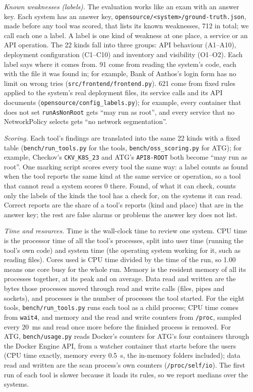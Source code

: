 \documentclass[conference]{IEEEtran}
\begin{document}
\textit{Known weaknesses (labels).} The evaluation works like an exam with an answer key. Each system has an answer key, \texttt{opensource/<system>/ground-truth.json}, made before any tool was scored, that lists its known weaknesses, 712 in total; we call each one a label. A label is one kind of weakness at one place, a service or an API operation. The 22 kinds fall into three groups: API behaviour (A1--A10), deployment configuration (C1--C10) and inventory and visibility (O1--O2). Each label says where it comes from. 91 come from reading the system's code, each with the file it was found in; for example, Bank of Anthos's login form has no limit on wrong tries (\texttt{src/frontend/frontend.py}). 621 come from fixed rules applied to the system's real deployment files, its service calls and its API documents (\texttt{opensource/config\_labels.py}); for example, every container that does not set \texttt{runAsNonRoot} gets ``may run as root'', and every service that no NetworkPolicy selects gets ``no network segmentation''.

\textit{Scoring.} Each tool's findings are translated into the same 22 kinds with a fixed table (\texttt{bench/run\_tools.py} for the tools, \texttt{bench/oss\_scoring.py} for ATG); for example, Checkov's \texttt{CKV\_K8S\_23} and ATG's \texttt{API8-ROOT} both become ``may run as root''. One marking script scores every tool the same way: a label counts as found when the tool reports the same kind at the same service or operation, so a tool that cannot read a system scores 0 there. Found, of what it can check, counts only the labels of the kinds the tool has a check for, on the systems it can read. Correct reports are the share of a tool's reports (kind and place) that are in the answer key; the rest are false alarms or problems the answer key does not list.

\textit{Time and resources.} Time is the wall-clock time to review one system. CPU time is the processor time of all the tool's processes, split into user time (running the tool's own code) and system time (the operating system working for it, such as reading files). Cores used is CPU time divided by the time of the run, so 1.00 means one core busy for the whole run. Memory is the resident memory of all its processes together, at its peak and on average. Data read and written are the bytes those processes moved through read and write calls (files, pipes and sockets), and processes is the number of processes the tool started. For the eight tools, \texttt{bench/run\_tools.py} runs each tool as a child process; CPU time comes from \texttt{wait4}, and memory and the read and write counters from \texttt{/proc}, sampled every 20~ms and read once more before the finished process is removed. For ATG, \texttt{bench/usage.py} reads Docker's counters for ATG's four containers through the Docker Engine API, from a watcher container that starts before the users (CPU time exactly, memory every 0.5~s, the in-memory folders included); data read and written are the scan process's own counters (\texttt{/proc/self/io}). The first run of each tool is slower because it loads its rules, so we report medians over the systems.
\end{document}
